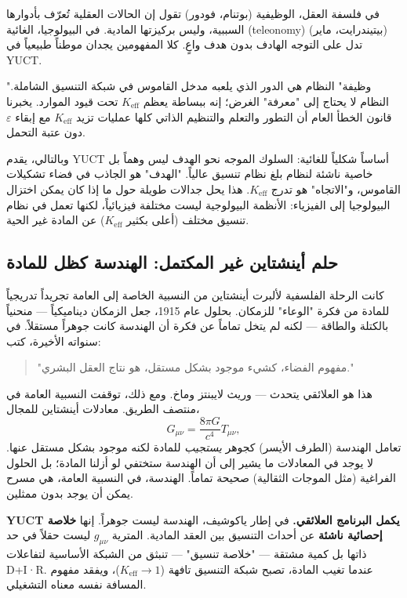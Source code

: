 \documentclass[12pt,a4paper]{article}
\begin{document}
	في فلسفة العقل، الوظيفية (بوتنام، فودور) تقول إن الحالات العقلية تُعرّف بأدوارها السببية، وليس بركيزتها المادية. في البيولوجيا، الغائية (teleonomy) (بيتيندرايت، ماير) تدل على التوجه الهادف بدون هدف واعٍ. كلا المفهومين يجدان موطناً طبيعياً في YUCT.
	
	"وظيفة" النظام هي الدور الذي يلعبه مدخل القاموس في شبكة التنسيق الشاملة. النظام لا يحتاج إلى "معرفة" الغرض؛ إنه ببساطة يعظم \(K_{\mathrm{eff}}\) تحت قيود الموارد. يخبرنا قانون الخطأ العام أن التطور والتعلم والتنظيم الذاتي كلها عمليات تزيد \(K_{\mathrm{eff}}\) مع إبقاء \(\varepsilon\) دون عتبة التحمل.
	
	وبالتالي، يقدم YUCT أساساً شكلياً للغائية: السلوك الموجه نحو الهدف ليس وهماً بل خاصية ناشئة لنظام بلغ نظام تنسيق عالياً. "الهدف" هو الجاذب في فضاء تشكيلات القاموس، و"الاتجاه" هو تدرج \(K_{\mathrm{eff}}\). هذا يحل جدالات طويلة حول ما إذا كان يمكن اختزال البيولوجيا إلى الفيزياء: الأنظمة البيولوجية ليست مختلفة فيزيائياً، لكنها تعمل في نظام تنسيق مختلف (أعلى بكثير \(K_{\mathrm{eff}}\)) عن المادة غير الحية.
	
	\subsection{حلم أينشتاين غير المكتمل: الهندسة كظل للمادة}
	
	كانت الرحلة الفلسفية لألبرت أينشتاين من النسبية الخاصة إلى العامة تجريداً تدريجياً للمادة من فكرة "الوعاء" للزمكان. بحلول عام 1915، جعل الزمكان ديناميكياً — منحنياً بالكتلة والطاقة — لكنه لم يتخل تماماً عن فكرة أن الهندسة كانت جوهراً مستقلاً. في سنواته الأخيرة، كتب:
	
	\begin{quote}
		"مفهوم الفضاء، كشيء موجود بشكل مستقل، هو نتاج العقل البشري."
	\end{quote}
	
	هذا هو العلائقي يتحدث — وريث لايبنتز وماخ. ومع ذلك، توقفت النسبية العامة في منتصف الطريق. معادلات أينشتاين للمجال،
	\[
	G_{\mu\nu} = \frac{8\pi G}{c^4} T_{\mu\nu},
	\]
	تعامل الهندسة (الطرف الأيسر) كجوهر \emph{يستجيب} للمادة لكنه موجود بشكل مستقل عنها. لا يوجد في المعادلات ما يشير إلى أن الهندسة ستختفي لو أزلنا المادة؛ بل الحلول الفراغية (مثل الموجات الثقالية) صحيحة تماماً. الهندسة، في النسبية العامة، هي مسرح يمكن أن يوجد بدون ممثلين.
	
	\textbf{YUCT يكمل البرنامج العلائقي.} في إطار ياكوشيف، الهندسة ليست جوهراً. إنها \textbf{خلاصة إحصائية ناشئة} عن أحداث التنسيق بين العقد المادية. المترية \(g_{\mu\nu}\) ليست حقلاً في حد ذاتها بل كمية مشتقة — "خلاصة تنسيق" — تنبثق من الشبكة الأساسية لتفاعلات D+I·R. عندما تغيب المادة، تصبح شبكة التنسيق تافهة (\(K_{\mathrm{eff}} \to 1\))، ويفقد مفهوم المسافة نفسه معناه التشغيلي.
	
\end{document}
